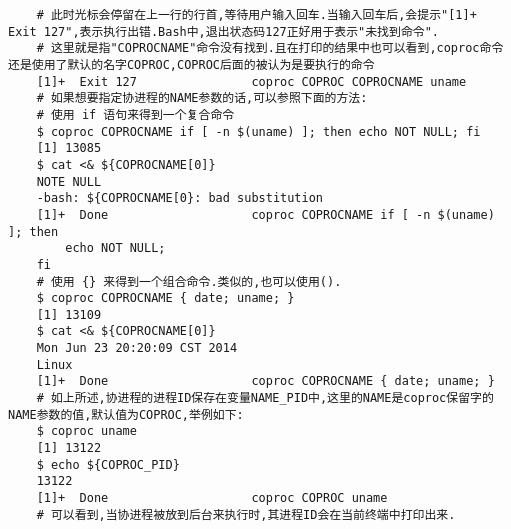 \documentclass[draft,openany]{book}
\begin{document}
\begin{CJK}{UTF8}{gbsn}
\begin{verbatim}
    # 此时光标会停留在上一行的行首,等待用户输入回车.当输入回车后,会提示"[1]+ Exit 127",表示执行出错.Bash中,退出状态码127正好用于表示"未找到命令".
    # 这里就是指"COPROCNAME"命令没有找到.且在打印的结果中也可以看到,coproc命令还是使用了默认的名字COPROC,COPROC后面的被认为是要执行的命令
    [1]+  Exit 127                coproc COPROC COPROCNAME uname
    # 如果想要指定协进程的NAME参数的话,可以参照下面的方法:
    # 使用 if 语句来得到一个复合命令
    $ coproc COPROCNAME if [ -n $(uname) ]; then echo NOT NULL; fi
    [1] 13085
    $ cat <& ${COPROCNAME[0]}
    NOTE NULL
    -bash: ${COPROCNAME[0}: bad substitution
    [1]+  Done                    coproc COPROCNAME if [ -n $(uname) ]; then
        echo NOT NULL;
    fi
    # 使用 {} 来得到一个组合命令.类似的,也可以使用().
    $ coproc COPROCNAME { date; uname; }
    [1] 13109
    $ cat <& ${COPROCNAME[0]}
    Mon Jun 23 20:20:09 CST 2014
    Linux
    [1]+  Done                    coproc COPROCNAME { date; uname; }
    # 如上所述,协进程的进程ID保存在变量NAME_PID中,这里的NAME是coproc保留字的NAME参数的值,默认值为COPROC,举例如下:
    $ coproc uname
    [1] 13122
    $ echo ${COPROC_PID}
    13122
    [1]+  Done                    coproc COPROC uname
    # 可以看到,当协进程被放到后台来执行时,其进程ID会在当前终端中打印出来.
    \end{verbatim}


\end{CJK}
\end{document}
